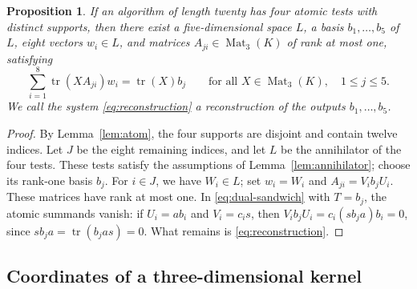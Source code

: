 \documentclass[11pt,a4paper]{article}
\numberwithin{equation}{section}
\theoremstyle{plain}
\newtheorem{prop}[theorem]{Proposition}
\theoremstyle{definition}
\DeclareMathOperator{\tr}{tr}\DeclareMathOperator{\rk}{rk}
\DeclareMathOperator{\Mat}{Mat}\DeclareMathOperator{\Span}{span}
\newcommand{\leqs}{\leqslant}\newcommand{\geqs}{\geqslant}
\begin{document}
\begin{prop}\label{prop:residual-model}
If an algorithm of length twenty has four atomic tests with distinct
supports, then there exist a five-dimensional space $L$, a basis
$b_1,\ldots,b_5$ of $L$, eight vectors $w_i\in L$, and matrices
$A_{ji}\in\Mat_3(K)$ of rank at most one, satisfying
\begin{equation}\label{eq:reconstruction}
 \sum_{i=1}^{8}\tr(XA_{ji})w_i=\tr(X)b_j
            \qquad\text{for all }X\in\Mat_3(K),\quad 1\leqs j\leqs5.
\end{equation}
We call the system \eqref{eq:reconstruction} a \emph{reconstruction of
the outputs} $b_1,\ldots,b_5$.
\end{prop}
\begin{proof}
By Lemma~\ref{lem:atom}, the four supports are disjoint and contain
twelve indices. Let $J$ be the eight remaining indices, and let $L$
be the annihilator of the four tests. These tests satisfy the
assumptions of Lemma~\ref{lem:annihilator}; choose its rank-one basis
$b_j$. For $i\in J$, we have $W_i\in L$; set $w_i=W_i$ and
$A_{ji}=V_i b_j U_i$. These matrices have rank at most one.
In \eqref{eq:dual-sandwich} with $T=b_j$, the atomic summands vanish:
if $U_i=ab_i$ and $V_i=c_i s$, then
$V_i b_j U_i=c_i(s b_j a)b_i=0$, since $s b_j a=\tr(b_j as)=0$.
What remains is \eqref{eq:reconstruction}.
\end{proof}

\subsection{Coordinates of a three-dimensional kernel}
\end{document}
